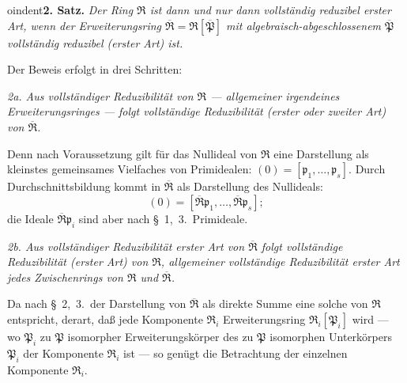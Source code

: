 \documentclass[12pt,a4paper]{article}
\newcommand{\mf}[1]{\mathfrak{#1}}     %
\newcommand{\idealp}{\mathfrak{p}}
\newcommand{\PP}{\mathfrak{P}}          %
\theoremstyle{definition}
\begin{document}
\medskip



oindent\textbf{2. Satz.} \textit{Der Ring $\mf{R}$ ist dann und nur dann
vollst\"andig reduzibel erster Art, wenn der Erweiterungsring
$\overline{\mf{R}} = \mf{R}[\overline{\PP}]$ mit algebraisch-abgeschlossenem
$\overline{\PP}$ vollst\"andig reduzibel (erster Art) ist.}

\medskip

Der Beweis erfolgt in drei Schritten:

\smallskip

\textit{2a. Aus vollst\"andiger Reduzibilit\"at von $\mf{R}$ --- allgemeiner irgendeines
Erweiterungsringes --- folgt vollst\"andige Reduzibilit\"at (erster oder
zweiter Art) von $\overline{\mf{R}}$.}

Denn nach Voraussetzung gilt f\"ur das Nullideal von $\mf{R}$ eine Darstellung
als kleinstes gemeinsames Vielfaches von Primidealen: $(0) =
[\idealp_1,\dots,\idealp_s]$. Durch Durchschnittsbildung kommt in
$\overline{\mf{R}}$ als Darstellung des Nullideals:
\[
(0) = [\overline{\mf{R}}\idealp_1,\dots,\overline{\mf{R}}\idealp_s];
\]
die Ideale $\overline{\mf{R}}\idealp_i$ sind aber nach \S~1,~3.\ Primideale.

\smallskip

\textit{2b. Aus vollst\"andiger Reduzibilit\"at erster Art von $\overline{\mf{R}}$
folgt vollst\"andige Reduzibilit\"at (erster Art) von $\mf{R}$, allgemeiner
vollst\"andige Reduzibilit\"at erster Art jedes Zwischenrings von $\mf{R}$
und $\overline{\mf{R}}$.}

Da nach \S~2,~3.\ der Darstellung von $\overline{\mf{R}}$ als direkte Summe eine
solche von $\mf{R}$ entspricht, derart, da\ss{} jede Komponente $\mf{R}_i$
Erweiterungsring $\mf{R}_i[\PP_i]$ wird --- wo $\PP_i$ zu $\PP$ isomorpher
Erweiterungsk\"orper des zu $\PP$ isomorphen Unterk\"orpers $\PP_i$ der
Komponente $\mf{R}_i$ ist --- so gen\"ugt die Betrachtung der einzelnen
Komponente $\mf{R}_i$.
\end{document}

